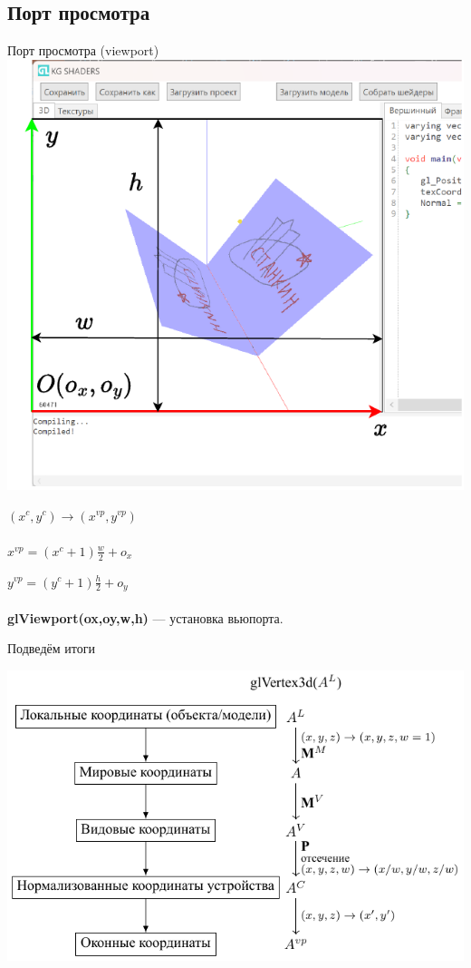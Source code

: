 \documentclass[10pt]{beamer}
\begin{document}
	
	\subsection{Порт просмотра}
	\begin{frame}{Порт просмотра (viewport)}
		{
			\includegraphics[width=\textwidth]{viewport.pdf}
		}
		{
			$(x^c,y^c) \rightarrow (x^{vp},y^{vp})$ \\ ~ \\
			
			$x^{vp} = (x^c+1)\frac{w}{2}+o_x$
			
			$y^{vp} = (y^c+1)\frac{h}{2}+o_y$ \\ ~ \\
			
			\textbf{glViewport(ox,oy,w,h)} --- установка вьюпорта.
			
			
		}
		
	\end{frame}
	
	
	\begin{frame}{Подведём итоги}
		
		\centering
		
		\includegraphics{itog.pdf}
		
		
	\end{frame}
	

\end{document}
